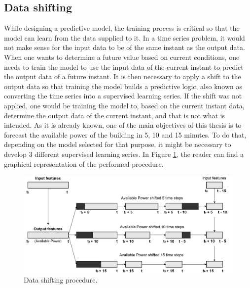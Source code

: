 \subsection{Data shifting}\label{chap3:subsec:data_shifting}

While designing a predictive model, the training process is critical so that the model can learn from the data supplied to it. In a time series problem, it would not make sense for the input data to be of the same instant as the output data. When one wants to determine a future value based on current conditions, one needs to train the model to use the input data of the current instant to predict the output data of a future instant. It is then necessary to apply a shift to the output data so that training the model builds a predictive logic, also known as converting the time series into a supervised learning series. If the shift was not applied, one would be training the model to, based on the current instant data, determine the output data of the current instant, and that is not what is intended. As it is already known, one of the main objectives of this thesis is to forecast the available power of the building in 5, 10 and 15 minutes. To do that, depending on the model selected for that purpose, it might be necessary to develop 3 different supervised learning series. In Figure \ref{shifting}, the reader can find a graphical representation of the performed procedure.


\begin{figure}[h!]
    \centering
    \begin{center}
    \includegraphics[width=1\textwidth]{Images/Data Shift.png}
    \caption{Data shifting procedure.}
    \label{shifting}
    \end{center}
\end{figure}

